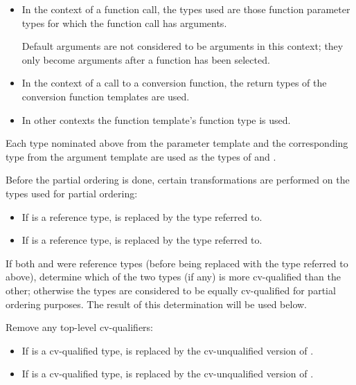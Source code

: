 \begin{itemize}
\item
In the context of a function call, the types used are those function parameter types
for which the function call has arguments.
\begin{footnote}
Default arguments
are not considered to be arguments in this context; they only become arguments
after a function has been selected.
\end{footnote}
\item
In the context of a call to a conversion function, the return types of
the conversion function templates are used.
\item
In other contexts the function template's function
type is used.
\end{itemize}

\pnum
Each type nominated above from the parameter template and the corresponding type from the
argument template are used as the types of
and
.

\pnum
Before the partial ordering is done, certain transformations are performed
on the types used for partial ordering:

\begin{itemize}
\item
If
is a reference type,
is replaced by the type referred to.
\item
If
is a reference type,
is replaced by the type referred to.
\end{itemize}

\pnum
If both
and
were reference types (before being replaced with the type referred to
above), determine which of the two types (if any) is more cv-qualified
than the other; otherwise the types are considered to be equally
cv-qualified for partial ordering purposes. The result of this
determination will be used below.

\pnum
Remove any top-level cv-qualifiers:
\begin{itemize}
\item
If
is a cv-qualified type,
is replaced by the cv-unqualified version of
.
\item
If
is a cv-qualified type,
is replaced by the cv-unqualified version of
.
\end{itemize}

